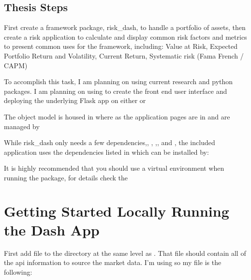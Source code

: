\documentclass[letterpaper,10pt,english]{sphinxmanual}
\begin{document}
\subsection{Thesis Steps}
\label{\detokenize{readme:thesis-steps}}
\sphinxAtStartPar
First create a framework package, risk\_dash, to handle a portfolio of
assets, then create a risk application to calculate and display common
risk factors and metrics to present common uses for the framework,
including: Value at Risk, Expected Portfolio Return and Volatility,
Current Return, Systematic risk (Fama \sphinxhyphen{} French / CAPM)

\sphinxAtStartPar
To accomplish this task, I am planning on using current research and
python packages. I am planning on using  to create the front end user interface
and deploying the underlying Flask app on either
 or

\sphinxAtStartPar
The object model is housed in  where as the application
pages are in  and are managed by 

\sphinxAtStartPar
While risk\_dash only needs a few
dependencies,,
,
,,
and , the
included application uses the dependencies listed in
which can be installed by:

\sphinxAtStartPar
{}

\sphinxAtStartPar
It is highly recommended that you should use a virtual environment when
running the package, for details check the 


\section{Getting Started \sphinxhyphen{} Locally Running the Dash App}
\label{\detokenize{readme:getting-started-locally-running-the-dash-app}}
\sphinxAtStartPar
First add file  to the directory at the same level as
. That file should contain all of the api information to
source the market data. I’m using 
so my  file is the following:
\end{document}
